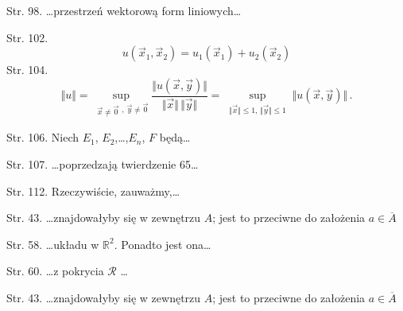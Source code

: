 \documentclass[a4paper,11pt]{article}
\begin{document}
\start Str. 98. \ldots przestrzeń wektorową form liniowych\ldots

\start Str. 102.
$$u(\vec{x}_{1},\vec{x}_{2})=u_{1}(\vec{x}_{1})+u_{2}(\vec{x}_{2})$$
\start Str. 104.
$$\Vert u \Vert = \sup_{ \substack{ \vec{ x } \neq \vec{ 0 } },
  \,\vec{ y } \neq \vec{ 0 } } \frac{ \Vert u( \vec x, \vec y ) \Vert
}{ \Vert \vec{ x } \Vert \, \Vert \vec y \Vert } = \sup_{ \substack{
    \Vert \vec{ x } \Vert \leq 1, \, \Vert \vec{ y } \Vert \leq 1 } }
\Vert u( \vec x, \vec y ) \Vert \, .$$

\start Str. 106. Niech $E_{ 1 }$, $E_{ 2 }$,\ldots,$E_{ n }$, $F$
będą\ldots

\start Str. 107. \ldots poprzedzają twierdzenie 65\ldots

\start Str. 112. Rzeczywiście, zauważmy,\ldots

\start Str. 43. \ldots znajdowałyby się w zewnętrzu $A$; jest to
przeciwne do założenia $a \in \overline{ A }$

\start Str. 58. \ldots układu w $\mathbb{R}^{ 2 }$. Ponadto jest
ona\ldots

\start Str. 60. \ldots z pokrycia $\mathcal{R}$ \ldots

\start Str. 43. \ldots znajdowałyby się w zewnętrzu $A$; jest to
przeciwne do założenia $a \in \overline{ A }$
\end{document}

